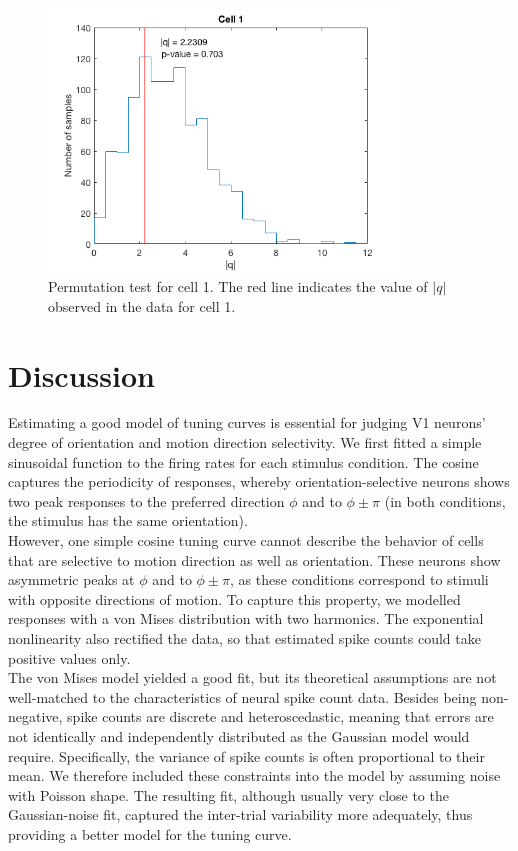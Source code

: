\documentclass[10pt]{article}
\begin{document}
\begin{figure}[!h]
\centering
\includegraphics[height=7cm]{permplot1.png}
\caption{Permutation test for cell 1. The red line indicates the value of $|q|$ observed in the data for cell 1.
\label{permplot1}}
\end{figure}

 
\section*{Discussion}

Estimating a good model of tuning curves is essential for judging V1 neurons' degree of orientation and motion direction selectivity. We first fitted a simple sinusoidal function to the firing rates for each stimulus condition. The cosine captures the periodicity of responses, whereby orientation-selective neurons shows two peak responses to the preferred direction $\phi$ and to $\phi \pm \pi$ (in both conditions, the stimulus has the same orientation). \\

However, one simple cosine tuning curve cannot describe the behavior of cells that are selective to motion direction as well as orientation. These neurons show asymmetric peaks at $\phi$ and to $\phi \pm \pi$, as these conditions correspond to stimuli with opposite directions of motion. To capture this property, we modelled responses with a von Mises distribution with two harmonics. The exponential nonlinearity also rectified the data, so that estimated spike counts could take positive values only. \\

The von Mises model yielded a good fit, but its theoretical assumptions are not well-matched to the characteristics of neural spike count data. Besides being non-negative, spike counts are discrete and heteroscedastic, meaning that errors are not identically and independently distributed as the Gaussian model would require. Specifically, the variance of spike counts is often proportional to their mean. We therefore included these constraints into the model by assuming noise with Poisson shape. The resulting fit, although usually very close to the Gaussian-noise fit, captured the inter-trial variability more adequately, thus providing a better model for the tuning curve.
\end{document}
